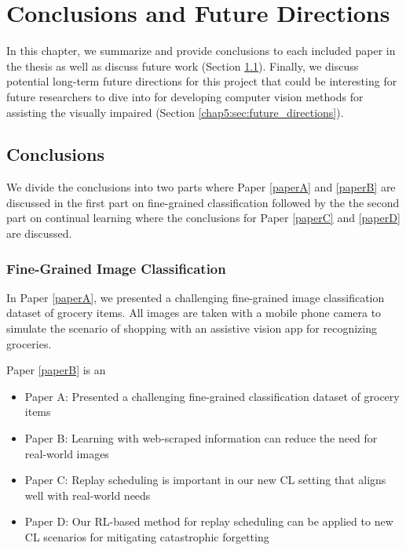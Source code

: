 
\chapter{Conclusions and Future Directions}\label{chap5}

In this chapter, we summarize and provide conclusions to each included paper in the thesis as well as discuss future work (Section \ref{chap5:sec:conclusions}). Finally, we discuss potential long-term future directions for this project that could be interesting for future researchers to dive into for developing computer vision methods for assisting the visually impaired (Section \ref{chap5:sec:future_directions}).

\section{Conclusions}\label{chap5:sec:conclusions}

We divide the conclusions into two parts where Paper \ref{paperA} and \ref{paperB} are discussed in the first part on fine-grained classification followed by the the second part on continual learning where the conclusions for Paper \ref{paperC} and \ref{paperD} are discussed.

\subsection{Fine-Grained Image Classification}

In Paper \ref{paperA}, we presented a challenging fine-grained image classification dataset of grocery items. All images are taken with a mobile phone camera to simulate the scenario of shopping with an assistive vision app for recognizing groceries. 


Paper \ref{paperB} is an 


\begin{itemize}
	\item Paper A: Presented a challenging fine-grained classification dataset of grocery items
	\item Paper B: Learning with web-scraped information can reduce the need for real-world images
	\item Paper C: Replay scheduling is important in our new CL setting that aligns well with real-world needs
	\item Paper D: Our RL-based method for replay scheduling can be applied to new CL scenarios for mitigating catastrophic forgetting
\end{itemize}



